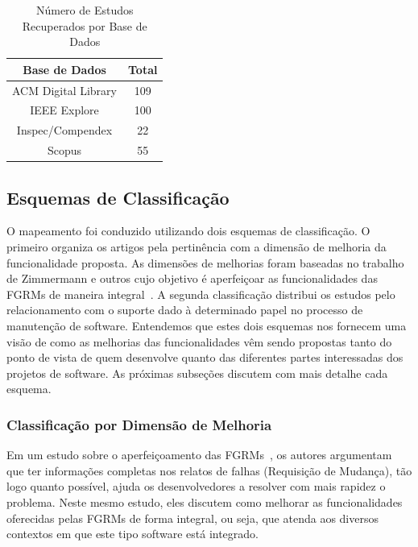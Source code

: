 \begin{table}[htb]
	\centering
	\begin{tabular}{cc}
		\toprule
		\textbf{Base de Dados} & \textbf{Total} \\
		\midrule
	   	ACM Digital Library & 109\\
	   	IEEE Explore        & 100\\
		Inspec/Compendex    & 22 \\ 
		Scopus              & 55 \\
		\bottomrule
	\end{tabular}
	\caption{Número de Estudos Recuperados por Base de Dados}
\label{tab:estudos-por-base-dados}
\end{table}

\subsection{Esquemas de Classificação}
\label{subsec:map-esquemas-classificacao}

O mapeamento foi conduzido utilizando dois esquemas de classificação. O primeiro
organiza os artigos pela pertinência com a dimensão de melhoria da
funcionalidade proposta. As dimensões de melhorias foram baseadas no trabalho de
Zimmermann e outros cujo objetivo é aperfeiçoar as funcionalidades das FGRMs de
maneira integral~\cite{zimmermann2009improving}. A segunda classificação
distribui os estudos pelo relacionamento com o suporte dado à determinado papel
no processo de manutenção de software. Entendemos que estes dois esquemas nos
fornecem uma visão de como as melhorias das funcionalidades vêm sendo propostas
tanto do ponto de vista de quem desenvolve quanto das diferentes partes
interessadas dos projetos de software. As pró\-xi\-mas subseções discutem com
mais detalhe cada esquema.

\subsubsection{Classificação por Dimensão de Melhoria}
\label{subsubsec:map-esquema-suporte-problema}

Em um estudo sobre o aperfeiçoamento das FGRMs~\cite{zimmermann2009improving},
os autores argumentam que ter informações completas nos relatos de falhas
(Requisição de Mudança), tão logo quanto possível, ajuda os desenvolvedores a
resolver com mais rapidez o problema. Neste mesmo estudo, eles discutem como
melhorar as funcionalidades oferecidas pelas FGRMs de forma integral, ou seja,
que atenda aos diversos contextos em que este tipo software está integrado.

